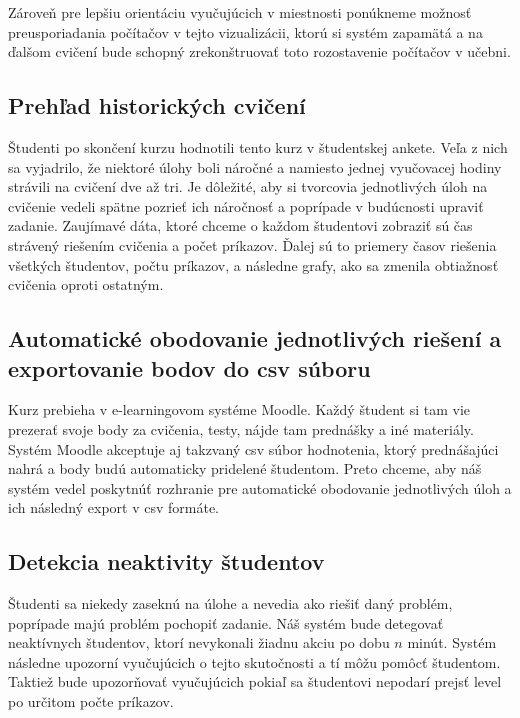Zároveň pre lepšiu orientáciu vyučujúcich v miestnosti ponúkneme možnosť
preusporiadania počítačov v tejto vizualizácii, ktorú si systém zapamätá a
na ďalšom cvičení bude schopný zrekonštruovať toto rozostavenie počítačov v učebni.

\subsection{Prehľad historických cvičení}
\label{sec:apprequirements:overview}

Študenti po skončení kurzu hodnotili tento kurz v študentskej ankete. Veľa z nich
sa vyjadrilo, že niektoré úlohy boli náročné a namiesto jednej vyučovacej hodiny
strávili na cvičení dve až tri.
Je dôležité, aby si tvorcovia jednotlivých úloh na cvičenie vedeli spätne pozrieť
ich náročnosť a poprípade v budúcnosti upraviť zadanie.
Zaujímavé dáta, ktoré chceme o každom študentovi zobraziť sú čas strávený riešením cvičenia a počet príkazov. Ďalej sú to priemery časov riešenia všetkých študentov,
počtu príkazov, a následne grafy, ako sa zmenila obtiažnosť cvičenia oproti ostatným.


\subsection{Automatické obodovanie jednotlivých riešení a exportovanie bodov do csv súboru}
\label{sec:apprequirements:export}

Kurz prebieha v e-learningovom systéme Moodle. Každý študent si tam vie prezerať
svoje body za cvičenia, testy, nájde tam prednášky a iné materiály. Systém Moodle akceptuje aj takzvaný
csv súbor hodnotenia, ktorý prednášajúci nahrá a body budú automaticky pridelené
študentom. Preto chceme, aby náš systém vedel poskytnúť rozhranie pre automatické
obodovanie jednotlivých úloh a ich následný export v csv formáte.

\subsection{Detekcia neaktivity študentov}
\label{sec:apprequirements:noactivity}

Študenti sa niekedy zaseknú na úlohe a nevedia ako riešiť daný problém, poprípade
majú problém pochopiť zadanie. Náš systém bude detegovať neaktívnych študentov, ktorí
nevykonali žiadnu akciu po dobu $n$ minút. Systém následne upozorní vyučujúcich o tejto
skutočnosti a tí môžu pomôcť študentom.
Taktiež bude upozorňovať vyučujúcich pokiaľ sa študentovi nepodarí prejsť level
po určitom počte príkazov.

